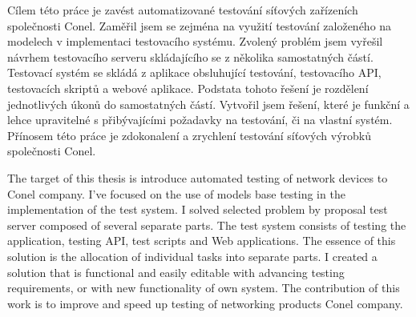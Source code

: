 \startAbstractCz
Cílem této práce je zavést automatizované testování síťových zařízeních společnosti Conel. Zaměřil jsem se zejména na využití testování založeného na modelech v implementaci testovacího systému. Zvolený problém jsem vyřešil návrhem testovacího serveru skládajícího se z několika samostatných částí. Testovací systém se skládá z aplikace obsluhující testování, testovacího API, testovacích skriptů a webové aplikace. Podstata tohoto řešení je rozdělení jednotlivých úkonů do samostatných částí. Vytvořil jsem řešení, které je funkční a lehce upravitelné s přibývajícími požadavky na testování, či na vlastní systém. Přínosem této práce je zdokonalení a zrychlení testování síťových výrobků společnosti Conel.
\stopAbstractCz

\startAbstractEn
The target of this thesis is introduce automated testing of network devices to  Conel company. I've focused on the use of models base testing in the implementation of the test system. I solved selected problem by proposal test server composed of several separate parts. The test system consists of testing the application, testing API, test scripts and Web applications. The essence of this solution is the allocation of individual tasks into separate parts. I created a solution that is functional and easily editable with advancing testing requirements, or with new functionality of own system. The contribution of this work is to improve and speed up testing of networking products Conel company.

\stopAbstractEn
\endinput
